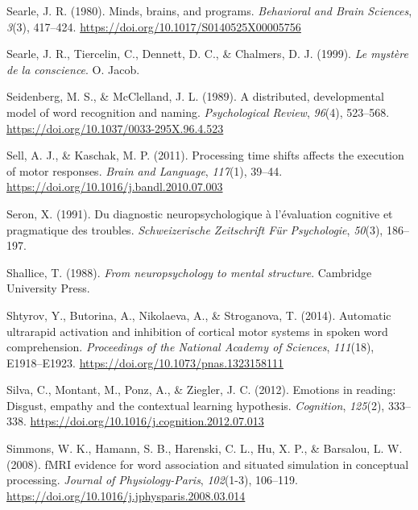\documentclass[
  a4paper,12pt,twoside,onecolumn,openright,final,oldfontcommands]{memoir}
\newlength{\cslhangindent}
\newlength{\cslentryspacingunit} %
\newenvironment{CSLReferences}[2] %
 {%
  \setlength{\parindent}{0pt}
  \ifodd #1
  \let\oldpar\par
  \def\par{\hangindent=\cslhangindent\oldpar}
  \fi
  \setlength{\parskip}{#2\cslentryspacingunit}
 }%
 {}
\begin{document}
\begin{CSLReferences}{1}{0}
\leavevmode{}%
Searle, J. R. (1980). Minds, brains, and programs. \emph{Behavioral and Brain Sciences}, \emph{3}(3), 417--424. \url{https://doi.org/10.1017/S0140525X00005756}

\leavevmode{}%
Searle, J. R., Tiercelin, C., Dennett, D. C., \& Chalmers, D. J. (1999). \emph{Le mystère de la conscience}. O. Jacob.

\leavevmode{}%
Seidenberg, M. S., \& McClelland, J. L. (1989). A distributed, developmental model of word recognition and naming. \emph{Psychological Review}, \emph{96}(4), 523--568. \url{https://doi.org/10.1037/0033-295X.96.4.523}

\leavevmode{}%
Sell, A. J., \& Kaschak, M. P. (2011). Processing time shifts affects the execution of motor responses. \emph{Brain and Language}, \emph{117}(1), 39--44. \url{https://doi.org/10.1016/j.bandl.2010.07.003}

\leavevmode{}%
Seron, X. (1991). Du diagnostic neuropsychologique à l'évaluation cognitive et pragmatique des troubles. \emph{Schweizerische Zeitschrift Für Psychologie}, \emph{50}(3), 186--197.

\leavevmode{}%
Shallice, T. (1988). \emph{From neuropsychology to mental structure}. Cambridge University Press.

\leavevmode{}%
Shtyrov, Y., Butorina, A., Nikolaeva, A., \& Stroganova, T. (2014). Automatic ultrarapid activation and inhibition of cortical motor systems in spoken word comprehension. \emph{Proceedings of the National Academy of Sciences}, \emph{111}(18), E1918--E1923. \url{https://doi.org/10.1073/pnas.1323158111}

\leavevmode{}%
Silva, C., Montant, M., Ponz, A., \& Ziegler, J. C. (2012). Emotions in reading: {Disgust}, empathy and the contextual learning hypothesis. \emph{Cognition}, \emph{125}(2), 333--338. \url{https://doi.org/10.1016/j.cognition.2012.07.013}

\leavevmode{}%
Simmons, W. K., Hamann, S. B., Harenski, C. L., Hu, X. P., \& Barsalou, L. W. (2008). {fMRI} evidence for word association and situated simulation in conceptual processing. \emph{Journal of Physiology-Paris}, \emph{102}(1-3), 106--119. \url{https://doi.org/10.1016/j.jphysparis.2008.03.014}


\end{CSLReferences}
\end{document}

